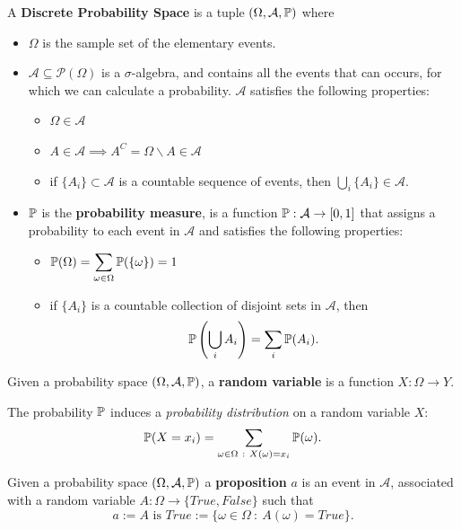 \documentclass[10pt, letterpaper]{report}
\begin{document}
\begin{definition}
	A \textbf{Discrete Probability Space} is a tuple $(\Omega,\mathcal A,{\mathbb P})$ where\begin{itemize}
		\item $\Omega$ is the sample set of the elementary events.
		\item $\mathcal A\subseteq\mathcal P(\Omega)$ is a $\sigma$-algebra, and contains all the events that can occurs, for which we can calculate a probability. $\mathcal A$ satisfies the following properties:\begin{itemize}
			      \item $\Omega\in\mathcal A$
			      \item $A\in\mathcal A\implies A^C=\Omega\backslash A\in \mathcal A$
			      \item if $\{A_i\}\subset\mathcal A$ is a countable sequence of events, then $\bigcup_i\{A_i\}\in\mathcal A$.
		      \end{itemize}
		\item ${\mathbb P}$ is the \textbf{probability measure}, is a function ${\mathbb P}:\mathcal A\rightarrow[0,1]$ that assigns a probability to each event in $\mathcal A$ and satisfies the following properties:\begin{itemize}
			      \item ${\mathbb P}(\Omega)=\displaystyle\sum_{\omega\in\Omega}{\mathbb P}(\{\omega\})=1$
			      \item if $\{A_i\}$ is a countable collection of disjoint sets in $\mathcal A$, then\begin{equation}
				            {\mathbb P}\left(\bigcup_{i}A_i\right)=\sum_i{\mathbb P}(A_i).
			            \end{equation}
		      \end{itemize}
	\end{itemize}
\end{definition}
\begin{definition}
	Given a probability space $(\Omega,\mathcal A,{\mathbb P})$, a \textbf{random variable} is a function $X:\Omega\rightarrow Y$.
\end{definition}
The probability ${\mathbb P}$ induces a \textit{probability distribution} on a random variable $X$:\begin{equation}
	\Prob(X=x_i)=\sum_{\omega\in\Omega \ : \ X(\omega)=x_i}\Prob(\omega).
\end{equation}
\begin{definition}
	Given a probability space $(\Omega,\mathcal A,{\mathbb P})$ a \textbf{proposition} $a$ is an event in $\mathcal A$, associated with a random variable $A:\Omega\rightarrow\{True,False\} $ such that\begin{equation}
		a := A \text{ is } True := \{\omega\in\Omega \ : \ A(\omega)=True\}.
	\end{equation}
\end{definition}
\end{document}
